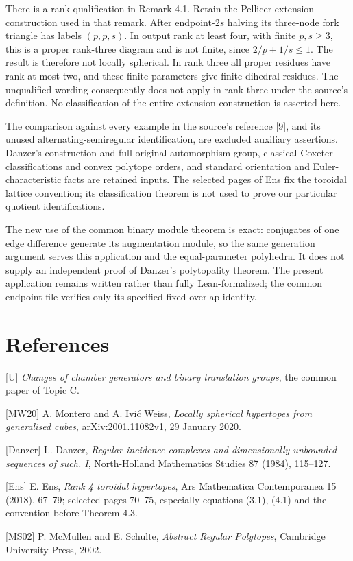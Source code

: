 There is a rank qualification in Remark 4.1. Retain the Pellicer
extension construction used in that remark. After endpoint-$2s$
halving its three-node fork triangle has labels $(p,p,s)$. In output
rank at least four, with finite $p,s\ge3$, this is a proper rank-three
diagram and is not finite, since $2/p+1/s\le1$. The result is therefore
not locally spherical. In rank three all proper residues have rank at
most two, and these finite parameters give finite dihedral residues.
The unqualified wording consequently does not apply in rank three
under the source's definition. No classification of the entire
extension construction is asserted here.

The comparison against every example in the source's reference [9],
and its unused alternating-semiregular identification, are excluded
auxiliary assertions. Danzer's construction and full original
automorphism group, classical Coxeter classifications and convex
polytope orders, and standard orientation and Euler-characteristic
facts are retained inputs. The selected pages of Ens fix the toroidal
lattice convention; its classification theorem is not used to prove
our particular quotient identifications.

The new use of the common binary module theorem is exact: conjugates
of one edge difference generate its augmentation module, so the same
generation argument serves this application and the equal-parameter
polyhedra. It does not supply an independent proof of Danzer's
polytopality theorem. The present application remains written rather
than fully Lean-formalized; the common endpoint file verifies only its
specified fixed-overlap identity.

\section*{References}
{[}U{]} \emph{Changes of chamber generators and binary translation
groups}, the common paper of Topic C.

{[}MW20{]} A. Montero and A. Ivi\'c Weiss,
\emph{Locally spherical hypertopes from generalised cubes},
arXiv:2001.11082v1, 29 January 2020.

{[}Danzer{]} L. Danzer, \emph{Regular incidence-complexes and
dimensionally unbounded sequences of such. I}, North-Holland
Mathematics Studies 87 (1984), 115--127.

{[}Ens{]} E. Ens, \emph{Rank 4 toroidal hypertopes}, Ars Mathematica
Contemporanea 15 (2018), 67--79; selected pages 70--75, especially
equations (3.1), (4.1) and the convention before Theorem 4.3.

{[}MS02{]} P. McMullen and E. Schulte, \emph{Abstract Regular
Polytopes}, Cambridge University Press, 2002.

